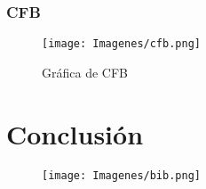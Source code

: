 \documentclass[10pt]{article}
\begin{document}
		\subsubsection{CFB}			
			\begin{figure}[H]
				\centering
				\texttt{[image: Imagenes/cfb.png]}
				\caption{Gráfica de CFB}
			\end{figure}


	
	
\section{Conclusión}


\begin{figure}[H]
\centering
\texttt{[image: Imagenes/bib.png]}

\end{figure}	
\end{document}
